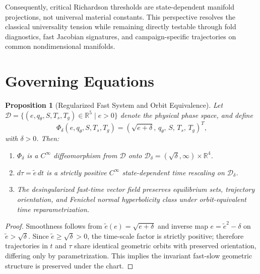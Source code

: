 \documentclass[11pt]{article}
\newtheorem{proposition}{Proposition}
\begin{document}
Consequently, critical Richardson thresholds are state-dependent manifold projections, not universal material constants. This perspective resolves the classical universality tension while remaining directly testable through fold diagnostics, fast Jacobian signatures, and campaign-specific trajectories on common nondimensional manifolds.


\section{Governing Equations}
\label{sec:governing_equations}

\begin{proposition}[Regularized Fast System and Orbit Equivalence]
Let $\mathcal{D} = \{ (e, q_\theta, S, T_s, T_g) \in \mathbb{R}^5 \mid e > 0 \}$ denote the physical phase space, and define
\begin{equation}
\Phi_\delta(e, q_\theta, S, T_s, T_g)
= \left( \sqrt{e + \delta}, \, q_\theta, \, S, \, T_s, \, T_g \right)^T,
\end{equation}
with $\delta > 0$. Then:
\begin{enumerate}
\item $\Phi_\delta$ is a $C^\infty$ diffeomorphism from $\mathcal{D}$ onto $\mathcal{D}_\delta = (\sqrt{\delta}, \infty) \times \mathbb{R}^4$.
\item $d\tau = \tilde{e} \, dt$ is a strictly positive $C^\infty$ state-dependent time rescaling on $\mathcal{D}_\delta$.
\item The desingularized fast-time vector field preserves equilibrium sets, trajectory orientation, and Fenichel normal hyperbolicity class under orbit-equivalent time reparametrization.
\end{enumerate}
\end{proposition}

\begin{proof}
Smoothness follows from $\tilde{e}(e)=\sqrt{e+\delta}$ and inverse map $e=\tilde{e}^2-\delta$ on $\tilde{e}>\sqrt{\delta}$.
Since $\tilde{e}\ge\sqrt{\delta}>0$, the time-scale factor is strictly positive; therefore trajectories in $t$ and $\tau$ share identical geometric orbits with preserved orientation, differing only by parametrization.
This implies the invariant fast-slow geometric structure is preserved under the chart.
\end{proof}
\end{document}
